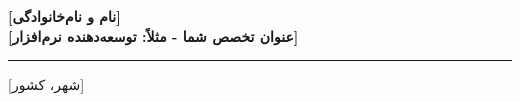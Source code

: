 \documentclass[10pt,a4paper]{article}
\newcommand{\cvsidebarsect}[1]{
	\vspace{4mm}
	\noindent{\large\bfseries\textcolor{sidebartitle}{#1}}
	\vspace{1mm}\par
	\noindent\textcolor{sidebartitle!40}{\rule{\linewidth}{0.5pt}}\par
	\vspace{2mm}
}
\begin{document}
	\pagestyle{empty}
	
	\noindent
	\begin{minipage}[t]{6cm}
		\vspace*{0pt}
		
		\begin{center}
		\end{center}
		
		\vspace{1.5mm}
		
		\begin{center}
			{\LARGE \textbf{\textcolor{sidebartitle}{[نام و نام‌خانوادگی]}}}\\[2.5mm]
			{\footnotesize \textbf{\textcolor{accent}{[عنوان تخصص شما - مثلاً: توسعه‌دهنده نرم‌افزار]}}}
		\end{center}
		
		\cvsidebarsect{اطلاعات تماس}
		\noindent\textcolor{accent}{\small \faMapMarker*} \quad \textcolor{sidebartext}{\footnotesize [شهر، کشور]} \par\vspace{1.5mm}
		\noindent\textcolor{accent}{\small \faPhone} \quad \textcolor{sidebartext}{\footnotesize\lr{[0912 000 0000]}} \par\vspace{1.5mm}
		\noindent\textcolor{accent}{\small \faEnvelope} \quad \href{mailto:your.email@example.com}{\textcolor{sidebartext}{\footnotesize{}}} \par\vspace{1.5mm}
		\noindent\textcolor{accent}{\small \faTelegram} \quad \href{https://t.me/YourUsername}{\textcolor{sidebartext}{\footnotesize{}}} \par\vspace{1.5mm}
		\noindent\textcolor{accent}{\small \faGithub} \quad \href{https://github.com/YourUsername}{\textcolor{sidebartext}{\footnotesize{}}} \par\vspace{1.5mm}
		

\end{minipage}
\end{document}
